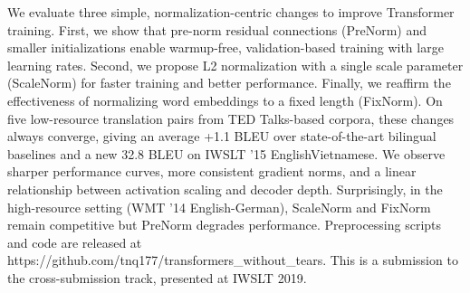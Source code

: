 We evaluate three simple, normalization-centric changes to improve Transformer training. First, we show that pre-norm residual connections (PreNorm) and smaller initializations enable warmup-free, validation-based training with large learning rates. Second, we propose L2 normalization with a single scale parameter (ScaleNorm) for faster training and better performance. Finally, we reaffirm the effectiveness of normalizing word embeddings to a fixed length (FixNorm). On five low-resource translation pairs from TED Talks-based corpora, these changes always converge, giving an average +1.1 BLEU over state-of-the-art bilingual baselines and a new 32.8 BLEU on IWSLT '15 EnglishVietnamese. We observe sharper performance curves, more consistent gradient norms, and a linear relationship between activation scaling and decoder depth. Surprisingly, in the high-resource setting (WMT '14 English-German), ScaleNorm and FixNorm remain competitive but PreNorm degrades performance. Preprocessing scripts and code are released at https://github.com/tnq177/transformers\_without\_tears. This is a submission to the cross-submission track, presented at IWSLT 2019.
